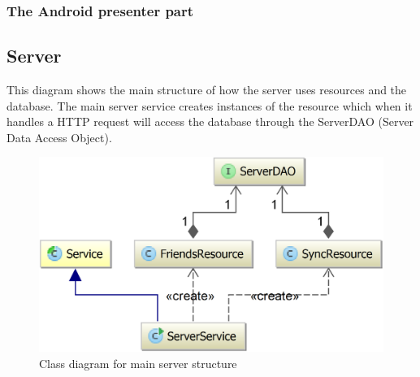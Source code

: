 \subsubsection{The Android presenter part}

\subsection{Server}
This diagram shows the main structure of how the server uses resources and the database. The main server service creates instances of the resource which when it handles a HTTP request will access the database through the ServerDAO (Server Data Access Object).
\begin{figure}[H]
\includegraphics[width=\textwidth]{ch/architecture/fig/classDiagramServer.png}
\caption{Class diagram for main server structure}
\end{figure}

